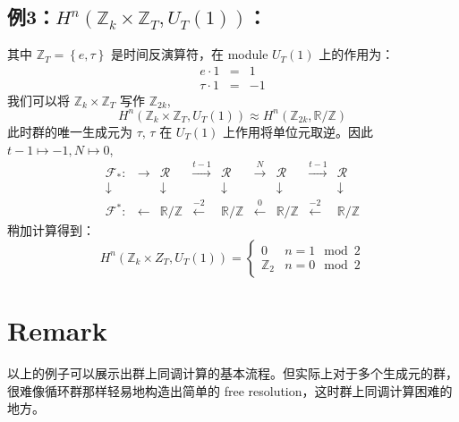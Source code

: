 \documentclass[UTF8]{ctexart}
\begin{document}
\subsection*{例3：$H^{n}\left(\mathbb{Z}_{k}\times\mathbb{Z}_{T},U_{T}\left(1\right)\right)$：}
\noindent
其中 $\mathbb{Z}_{T}=\left\{ e,\tau\right\} $ 是时间反演算符，在 module $U_{T}(1)$
上的作用为：
\begin{eqnarray}
e\cdot1 & = & 1\\
\tau\cdot1 & = & -1
\end{eqnarray}
我们可以将 $\mathbb{Z}_{k}\times\mathbb{Z}_{T}$ 写作 $\mathbb{Z}_{2k}$, 
\begin{equation}
H^{n}\left(\mathbb{Z}_{k}\times\mathbb{Z}_{T},U_{T}\left(1\right)\right)\approx H^{n}\left(\mathbb{Z}_{2k},\mathbb{R}/\mathbb{Z}\right)
\end{equation}
此时群的唯一生成元为 $\tau$, $\tau$ 在 $U_{T}(1)$ 上作用将单位元取逆。因此 $t-1\mapsto-1,N\mapsto0$,
\begin{equation}
\begin{array}{ccccccccc}
\mathcal{F}_{*}: & \rightarrow & \mathcal{R} & \stackrel{t-1}{\longrightarrow} & \mathcal{R} & \stackrel{N}{\longrightarrow} & \mathcal{R} & \stackrel{t-1}{\longrightarrow} & \mathcal{R}\\
\downarrow &  & \downarrow &  & \downarrow &  & \downarrow &  & \downarrow\\
\mathcal{F}^{*}: & \leftarrow & \mathbb{R}/\mathbb{Z} & \stackrel{-2}{\longleftarrow} & \mathbb{R}/\mathbb{Z} & \stackrel{0}{\longleftarrow} & \mathbb{R}/\mathbb{Z} & \stackrel{-2}{\longleftarrow} & \mathbb{R}/\mathbb{Z}
\end{array}
\end{equation}
稍加计算得到：
\begin{equation}
H^{n}\left(\mathbb{Z}_{k}\times Z_{T},U_{T}\left(1\right)\right)=\begin{cases}
0 & n=1\mod2\\
\mathbb{Z}_{2} & n=0\mod2
\end{cases}
\end{equation}

\section*{Remark}
\noindent
以上的例子可以展示出群上同调计算的基本流程。但实际上对于多个生成元的群，很难像循环群那样轻易地构造出简单的 free resolution，这时群上同调计算困难的地方。
\end{document}
